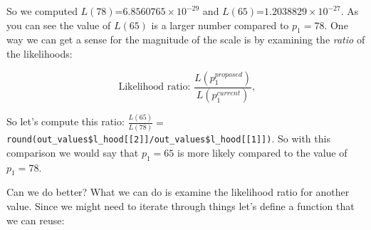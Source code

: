 \documentclass[
]{book}
\newenvironment{Shaded}{\begin{snugshade}}{\end{snugshade}}
\newcommand{\AttributeTok}[1]{\textcolor[rgb]{0.77,0.63,0.00}{#1}}
\newcommand{\CommentTok}[1]{\textcolor[rgb]{0.56,0.35,0.01}{\textit{#1}}}
\newcommand{\ControlFlowTok}[1]{\textcolor[rgb]{0.13,0.29,0.53}{\textbf{#1}}}
\newcommand{\DecValTok}[1]{\textcolor[rgb]{0.00,0.00,0.81}{#1}}
\newcommand{\FloatTok}[1]{\textcolor[rgb]{0.00,0.00,0.81}{#1}}
\newcommand{\FunctionTok}[1]{\textcolor[rgb]{0.00,0.00,0.00}{#1}}
\newcommand{\NormalTok}[1]{#1}
\newcommand{\OtherTok}[1]{\textcolor[rgb]{0.56,0.35,0.01}{#1}}
\newcommand{\SpecialCharTok}[1]{\textcolor[rgb]{0.00,0.00,0.00}{#1}}
\theoremstyle{definition}
\theoremstyle{definition}
\theoremstyle{definition}
\theoremstyle{remark}
\begin{document}
So we computed \(L(78)\)=\ensuremath{6.8560765\times 10^{-29}} and \(L(65)\)=\ensuremath{1.2038829\times 10^{-27}}. As you can see the value of \(L(65)\) is a larger number compared to \(p_{1}=78\). One way we can get a sense for the magnitude of the scale is by examining the \emph{ratio} of the likelihoods:

\begin{equation}
\mbox{ Likelihood ratio: } \frac{ L(p_{1}^{proposed}) }{ L(p_{1}^{current}) },
\end{equation}

So let's compute this ratio: \(\displaystyle \frac{ L(65) }{ L(78) }=\)\texttt{round(out\_values\$l\_hood{[}{[}2{]}{]}/out\_values\$l\_hood{[}{[}1{]}{]})}. So with this comparison we would say that \(p_{1}=65\) is more likely compared to the value of \(p_{1}=78\).

Can we do better? What we can do is examine the likelihood ratio for another value. Since we might need to iterate through things let's define a function that we can reuse:

\begin{Shaded}
\end{Shaded}
\end{document}
